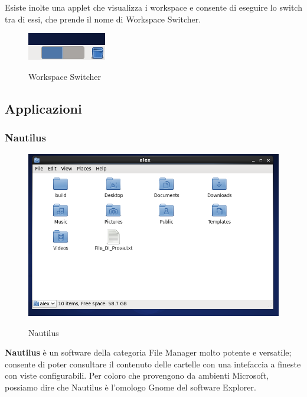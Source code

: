 
Esiste inolte una applet che visualizza i workspace e consente di eseguire lo switch tra di essi, che prende il nome di Workspace Switcher.

\begin{figure}[!ht]
\centering
 \includegraphics{Immagini/UI_WS_Switch1.png}
 \label{fig:Workspace Switcher}
 \caption{Workspace Switcher}
\end{figure}

\subsection{Applicazioni}

\subsubsection{Nautilus}

\begin{figure}[!ht]
\centering
 \includegraphics[scale=0.60]{Immagini/Nautilus1.png}
 \label{fig:Nautilus}
 \caption{Nautilus}
\end{figure}

\textbf{Nautilus} è un software della categoria File Manager molto potente e versatile; consente di poter consultare il contenuto delle cartelle con una intefaccia a fineste con viste configurabili. Per coloro che provengono da ambienti Microsoft\textregistered, possiamo dire che Nautilus è l'omologo Gnome del software Explorer.

